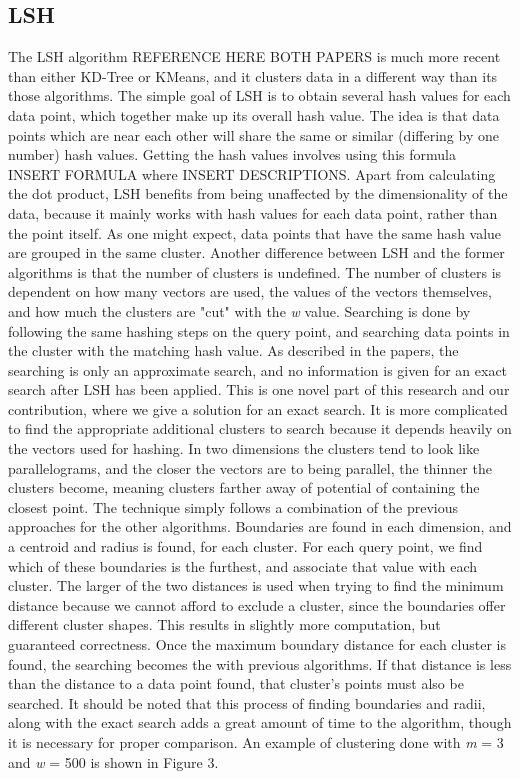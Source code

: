 \documentclass[journal]{IEEEtran}
\begin{document}
\subsection{LSH}
The LSH algorithm REFERENCE HERE BOTH PAPERS is much more recent than either KD-Tree or KMeans, and it clusters data in a different way than its those algorithms. The simple goal of LSH is to obtain several hash values for each data point, which together make up its overall hash value. The idea is that data points which are near each other will share the same or similar (differing by one number) hash values. Getting the hash values involves using this formula INSERT FORMULA where INSERT DESCRIPTIONS. Apart from calculating the dot product, LSH benefits from being unaffected by the dimensionality of the data, because it mainly works with hash values for each data point, rather than the point itself. As one might expect, data points that have the same hash value are grouped in the same cluster. Another difference between LSH and the former algorithms is that the number of clusters is undefined. The number of clusters is dependent on how many vectors are used, the values of the vectors themselves, and how much the clusters are "cut" with the \textit{w} value. Searching is done by following the same hashing steps on the query point, and searching data points in the cluster with the matching hash value. As described in the papers, the searching is only an approximate search, and no information is given for an exact search after LSH has been applied. This is one novel part of this research and our contribution, where we give a solution for an exact search. It is more complicated to find the appropriate additional clusters to search because it depends heavily on the vectors used for hashing. In two dimensions the clusters tend to look like parallelograms, and the closer the vectors are to being parallel, the thinner the clusters become, meaning clusters farther away of potential of containing the closest point. The technique simply follows a combination of the previous approaches for the other algorithms. Boundaries are found in each dimension, and a centroid and radius is found, for each cluster. For each query point, we find which of these boundaries is the furthest, and associate that value with each cluster. The larger of the two distances is used when trying to find the minimum distance because we cannot afford to exclude a cluster, since the boundaries offer different cluster shapes. This results in slightly more computation, but guaranteed correctness. Once the maximum boundary distance for each cluster is found, the searching becomes the with previous algorithms. If that distance is less than the distance to a data point found, that cluster's points must also be searched. It should be noted that this process of finding boundaries and radii, along with the exact search adds a great amount of time to the algorithm, though it is necessary for proper comparison. An example of clustering done with \textit{m} = 3 and \textit{w} = 500 is shown in Figure 3.
\end{document}

